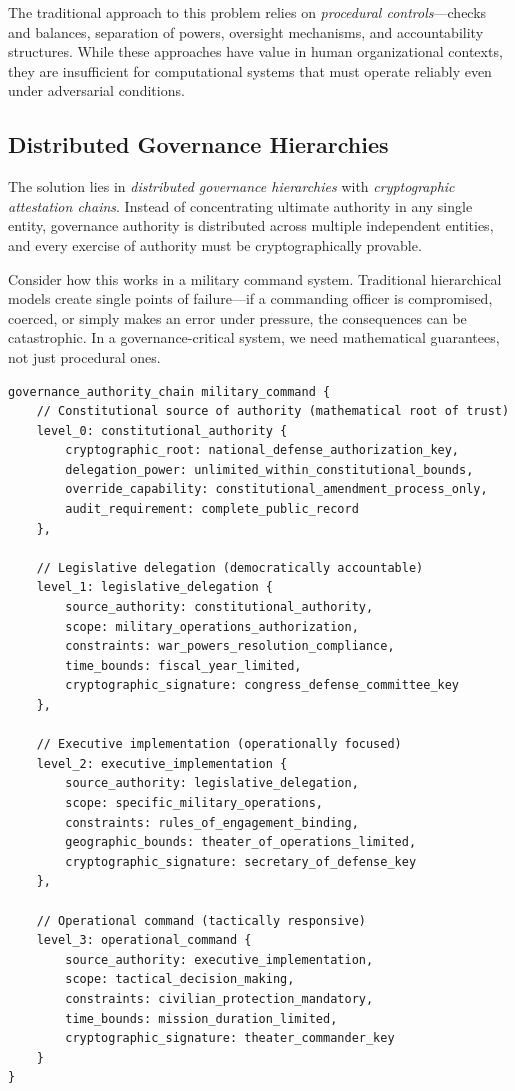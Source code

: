 The traditional approach to this problem relies on \textit{procedural controls}—checks and balances, separation of powers, oversight mechanisms, and accountability structures. While these approaches have value in human organizational contexts, they are insufficient for computational systems that must operate reliably even under adversarial conditions.

\subsection{Distributed Governance Hierarchies}

The solution lies in \textit{distributed governance hierarchies} with \textit{cryptographic attestation chains}. Instead of concentrating ultimate authority in any single entity, governance authority is distributed across multiple independent entities, and every exercise of authority must be cryptographically provable.

Consider how this works in a military command system. Traditional hierarchical models create single points of failure—if a commanding officer is compromised, coerced, or simply makes an error under pressure, the consequences can be catastrophic. In a governance-critical system, we need mathematical guarantees, not just procedural ones.

\begin{lstlisting}[language=rift, caption=Distributed Military Command Governance]
governance_authority_chain military_command {
    // Constitutional source of authority (mathematical root of trust)
    level_0: constitutional_authority {
        cryptographic_root: national_defense_authorization_key,
        delegation_power: unlimited_within_constitutional_bounds,
        override_capability: constitutional_amendment_process_only,
        audit_requirement: complete_public_record
    },
    
    // Legislative delegation (democratically accountable)
    level_1: legislative_delegation {
        source_authority: constitutional_authority,
        scope: military_operations_authorization,
        constraints: war_powers_resolution_compliance,
        time_bounds: fiscal_year_limited,
        cryptographic_signature: congress_defense_committee_key
    },
    
    // Executive implementation (operationally focused)
    level_2: executive_implementation {
        source_authority: legislative_delegation,
        scope: specific_military_operations,
        constraints: rules_of_engagement_binding,
        geographic_bounds: theater_of_operations_limited,
        cryptographic_signature: secretary_of_defense_key
    },
    
    // Operational command (tactically responsive)
    level_3: operational_command {
        source_authority: executive_implementation,
        scope: tactical_decision_making,
        constraints: civilian_protection_mandatory,
        time_bounds: mission_duration_limited,
        cryptographic_signature: theater_commander_key
    }
}
\end{lstlisting}

